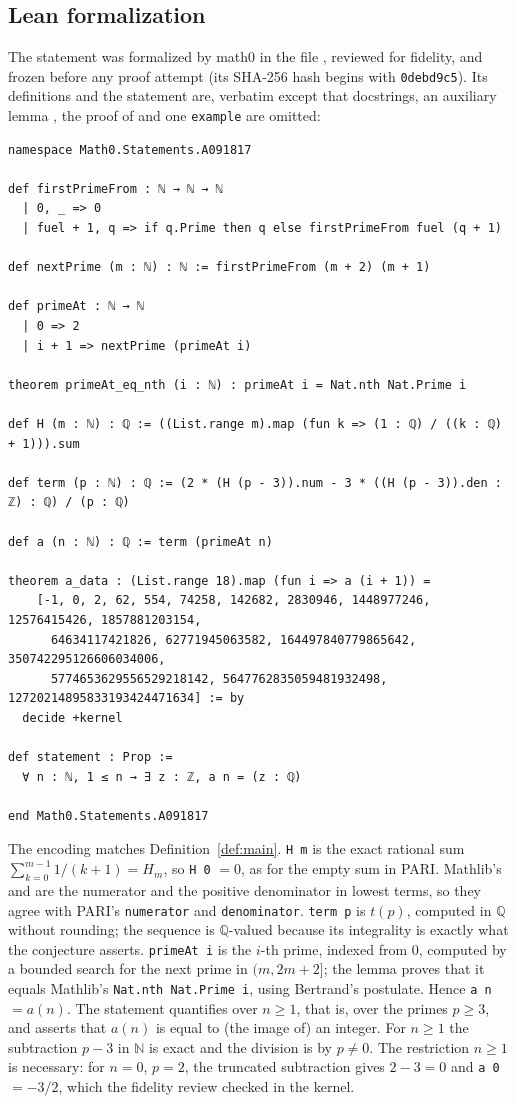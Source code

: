 \documentclass[11pt]{amsart}
\theoremstyle{plain}
\theoremstyle{definition}
\newcommand{\N}{\mathbb{N}}
\newcommand{\Q}{\mathbb{Q}}
\begin{document}
\subsection*{Lean formalization}
The statement was formalized by math0 in the file , reviewed for fidelity, and frozen before any proof attempt (its SHA-256 hash begins with \texttt{0debd9c5}). Its definitions and the statement are, verbatim except that docstrings, an auxiliary lemma , the proof of  and one \texttt{example} are omitted:
\begin{lstlisting}
namespace Math0.Statements.A091817

def firstPrimeFrom : ℕ → ℕ → ℕ
  | 0, _ => 0
  | fuel + 1, q => if q.Prime then q else firstPrimeFrom fuel (q + 1)

def nextPrime (m : ℕ) : ℕ := firstPrimeFrom (m + 2) (m + 1)

def primeAt : ℕ → ℕ
  | 0 => 2
  | i + 1 => nextPrime (primeAt i)

theorem primeAt_eq_nth (i : ℕ) : primeAt i = Nat.nth Nat.Prime i

def H (m : ℕ) : ℚ := ((List.range m).map (fun k => (1 : ℚ) / ((k : ℚ) + 1))).sum

def term (p : ℕ) : ℚ := (2 * (H (p - 3)).num - 3 * ((H (p - 3)).den : ℤ) : ℚ) / (p : ℚ)

def a (n : ℕ) : ℚ := term (primeAt n)

theorem a_data : (List.range 18).map (fun i => a (i + 1)) =
    [-1, 0, 2, 62, 554, 74258, 142682, 2830946, 1448977246, 12576415426, 1857881203154,
      64634117421826, 62771945063582, 164497840779865642, 350742295126606034006,
      5774653629556529218142, 5647762835059481932498, 12720214895833193424471634] := by
  decide +kernel

def statement : Prop :=
  ∀ n : ℕ, 1 ≤ n → ∃ z : ℤ, a n = (z : ℚ)

end Math0.Statements.A091817
\end{lstlisting}

The encoding matches Definition~\ref{def:main}.
\texttt{H m} is the exact rational sum $\sum_{k=0}^{m-1}1/(k+1)=H_m$, so \texttt{H 0} $=0$, as for the empty sum in PARI.
Mathlib's  and  are the numerator and the positive denominator in lowest terms, so they agree with PARI's \texttt{numerator} and \texttt{denominator}.
\texttt{term p} is $t(p)$, computed in $\Q$ without rounding; the sequence is $\Q$-valued because its integrality is exactly what the conjecture asserts.
\texttt{primeAt i} is the $i$-th prime, indexed from $0$, computed by a bounded search for the next prime in $(m,2m+2]$; the lemma  proves that it equals Mathlib's \texttt{Nat.nth Nat.Prime i}, using Bertrand's postulate. Hence \texttt{a n} $=a(n)$.
The statement quantifies over $n\ge1$, that is, over the primes $p\ge3$, and asserts that $a(n)$ is equal to (the image of) an integer. For $n\ge1$ the subtraction $p-3$ in $\N$ is exact and the division is by $p\ne0$. The restriction $n\ge1$ is necessary: for $n=0$, $p=2$, the truncated subtraction gives $2-3=0$ and \texttt{a 0} $=-3/2$, which the fidelity review checked in the kernel.
\end{document}
